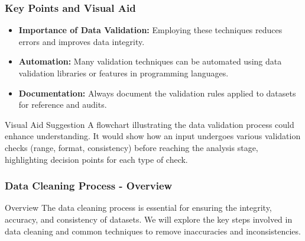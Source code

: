 \documentclass[aspectratio=169]{beamer}
\begin{document}
\begin{frame}
    \frametitle{Key Points and Visual Aid}
    \begin{itemize}
        \item \textbf{Importance of Data Validation:} Employing these techniques reduces errors and improves data integrity.
        \item \textbf{Automation:} Many validation techniques can be automated using data validation libraries or features in programming languages.
        \item \textbf{Documentation:} Always document the validation rules applied to datasets for reference and audits.
    \end{itemize}

    \begin{block}{Visual Aid Suggestion}
        A flowchart illustrating the data validation process could enhance understanding. It would show how an input undergoes various validation checks (range, format, consistency) before reaching the analysis stage, highlighting decision points for each type of check.
    \end{block}
\end{frame}

\begin{frame}[fragile]
    \frametitle{Data Cleaning Process - Overview}
    \begin{block}{Overview}
        The data cleaning process is essential for ensuring the integrity, accuracy, and consistency of datasets. 
        We will explore the key steps involved in data cleaning and common techniques to remove inaccuracies and inconsistencies.
    \end{block}
\end{frame}
\end{document}
